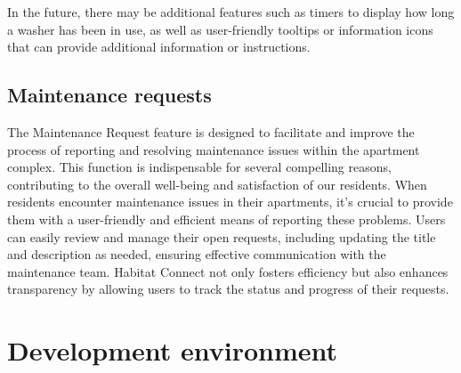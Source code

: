 \documentclass[conference]{IEEEtran}
\begin{document}
In the future, there may be additional features such as timers to display how long a washer has been in use, as well as user-friendly tooltips or information icons that can provide additional information or instructions.
\subsection{Maintenance requests}
The Maintenance Request feature is designed to facilitate and improve the process of reporting and resolving maintenance issues within the apartment complex.  This function is indispensable for several compelling reasons, contributing to the overall well-being and satisfaction of our residents. When residents encounter maintenance issues in their apartments, it's crucial to provide them with a user-friendly and efficient means of reporting these problems. Users can easily review and manage their open requests, including updating the title and description as needed, ensuring effective communication with the maintenance team. Habitat Connect not only fosters efficiency but also enhances transparency by allowing users to track the status and progress of their requests.  



\section{Development environment}
\end{document}
